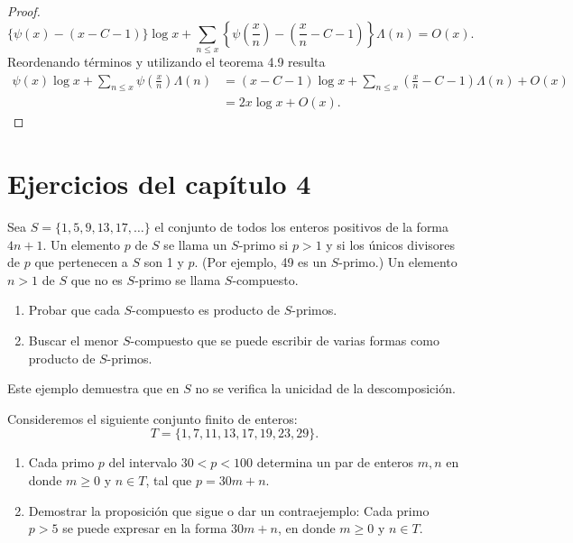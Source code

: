\documentclass[12pt,a4paper]{book}
\begin{document}
\begin{proof}
        \begin{equation*}
            \{\psi(x)-(x-C-1)\}\log x+\sum_{n\leq x}\left\{\psi\left(\frac{x}{n}\right)
            -\left(\frac{x}{n}-C-1\right)\right\}\Lambda(n)=O(x).
        \end{equation*}
        Reordenando términos y utilizando el teorema 4.9 resulta
        \begin{align*}
            \psi(x)\log x+\sum_{n\leq x}\psi\left(\frac{x}{n}\right)\Lambda(n)
            &=(x-C-1)\log x+\sum_{n\leq x}\left(\frac{x}{n}-C-1\right)\Lambda(n)+O(x)\\
            &=2x\log x+O(x).
        \end{align*}
    \end{proof}

    \section*{Ejercicios del capítulo 4}

    \begin{ejercicio}
        Sea $S=\{1,5,9,13,17,\dots\}$ el conjunto de todos los enteros positivos de la
        forma $4n+1$. Un elemento $p$ de $S$ se llama un $S$-primo si $p>1$ y si los
        únicos divisores de $p$ que pertenecen a $S$ son 1 y $p$. (Por ejemplo, 49 es
        un $S$-primo.) Un elemento $n>1$ de $S$ que no es $S$-primo se llama
        $S$-compuesto.
        \begin{enumerate}
            \item[(a)] Probar que cada $S$-compuesto es producto de $S$-primos.
            \item[(b)] Buscar el menor $S$-compuesto que se puede escribir de varias
            formas como producto de $S$-primos.
        \end{enumerate}
        Este ejemplo demuestra que en $S$ no se verifica la unicidad de la
        descomposición.
    \end{ejercicio}

    \begin{ejercicio}
        Consideremos el siguiente conjunto finito de enteros:
        \begin{equation*}
            T=\{1,7,11,13,17,19,23,29\}.
        \end{equation*}
        \begin{enumerate}
            \item[(a)] Cada primo $p$ del intervalo $30<p<100$ determina un par de
            enteros $m,n$ en donde $m\geq0$ y $n\in T$, tal que $p=30m+n$.
            \item[(b)] Demostrar la proposición que sigue o dar un contraejemplo:
            Cada primo $p>5$ se puede expresar en la forma $30m+n$, en donde $m\geq0$
            y $n\in T$.
        \end{enumerate}
    \end{ejercicio}
\end{document}
